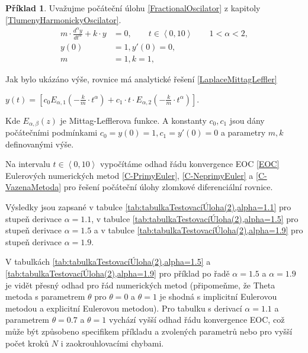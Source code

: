 \documentclass[a4paper,12pt,twoside]{article}
\theoremstyle{definition}
\newtheorem{prikl}[veta]{Příklad}
\theoremstyle{remark}
\numberwithin{equation}{section}
\numberwithin{table}{section}
\numberwithin{figure}{section}
\begin{document}
\newpage
\begin{prikl}\label{TestUlohaOsciator}
	Uvažujme počáteční úlohu \eqref{FractionalOscilator} z kapitoly \ref{TlumenyHarmonickyOscilator}.
	\begin{equation*}
		\begin{aligned}
			m \cdot \frac{d^{\alpha} y}{d t^{\alpha}} + k \cdot y &= 0, \qquad t \in \left\langle 0, 10\right\rangle \qquad 1 < \alpha <2,  \\
			y\left(0\right) &= 1, y'\left(0\right) = 0, \\
			m &= 1, k = 1, 
		\end{aligned}
	\end{equation*}

	Jak bylo ukázáno výše, rovnice má analytické řešení \eqref{LaplaceMittagLeffler}

	\begin{center}
		$	y\left(t\right) = \left[ c_{0} E_{\alpha, 1}\left(-\frac{k}{m}\cdot t^{\alpha}\right) + c_{1}\cdot t \cdot E_{\alpha, 2} \left(-\frac{k}{m}\cdot t ^{\alpha}\right)\right] .$
	\end{center}%

	Kde  $E_{\alpha, \beta}\left(z\right)$ je Mittag-Lefflerova funkce.
	A konstanty $c_{0}, c_{1}$ jsou dány počátečními  podmínkami $c_{0} = y\left(0\right) = 1, c_{1} = y'\left(0\right) = 0$ a parametry $m, k$ definovanými výše. 

	Na intervalu $t \in \left\langle 0, 10\right\rangle $ vypočítáme odhad řádu konvergence EOC \eqref{EOC} Eulerových numerických metod \eqref{C-PrimyEuler}, \eqref{C-NeprimyEuler} a \eqref{C-VazenaMetoda} pro řešení počáteční úlohy zlomkové diferenciální rovnice.
	
	Výsledky jsou zapsané v tabulce \ref{tab:tabulkaTestovacíÚloha(2),alpha=1.1} pro stupeň derivace $\alpha = 1.1$, v tabulce \ref{tab:tabulkaTestovacíÚloha(2),alpha=1.5} pro stupeň derivace $\alpha = 1.5$ a v tabulce \ref{tab:tabulkaTestovacíÚloha(2),alpha=1.9} pro stupeň derivace $\alpha = 1.9$. 
	
	V tabulkách \ref{tab:tabulkaTestovacíÚloha(2),alpha=1.5} a \ref{tab:tabulkaTestovacíÚloha(2),alpha=1.9} pro příklad  po řadě $\alpha = 1.5$ a $\alpha = 1.9$  je vidět přesný odhad pro řád numerických metod (připomeňme, že Theta metoda s parametrem $\theta$ pro $\theta = 0$ a  $\theta = 1$ je shodná s implicitní Eulerovou metodou a explicitní Eulerovou metodou). Pro tabulku s derivací $\alpha =1.1$ a parametrem $\theta = 0.7$ a $\theta = 1$ vychází vyšší odhad řádu konvergence EOC, což může být způsobeno specifikem příkladu a zvolených parametrů nebo pro vyšší počet kroků $N$ i zaokrouhlovacími chybami.


\end{prikl}
\end{document}

